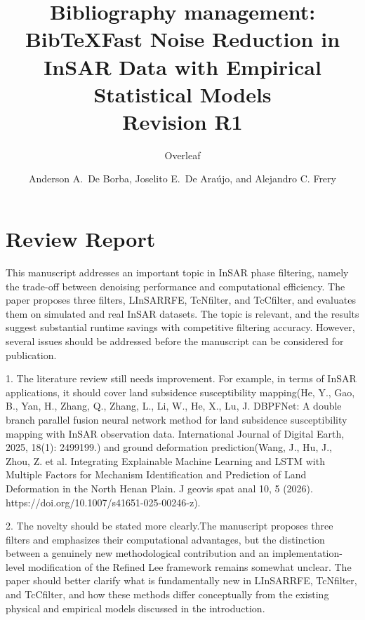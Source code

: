 \documentclass[a4paper,10pt]{article}
\title{Bibliography management: BibTeX}
\author{Overleaf}
\begin{document}
\title{Fast Noise Reduction in InSAR Data with Empirical Statistical Models\\
	Revision R1}


\author{Anderson A.\ De Borba,
	Joselito E.\ De Araújo, and
	Alejandro C. Frery}


\maketitle


\section{Review Report}
\begin{tcolorbox}[colback=red!5!white,colframe=red!75!black,title=Review Report]
This manuscript addresses an important topic in InSAR phase filtering, namely the trade-off between denoising performance and computational efficiency. The paper proposes three filters, LInSARRFE, TcNfilter, and TcCfilter, and evaluates them on
simulated and real InSAR datasets. The topic is relevant, and the results suggest
substantial runtime savings with competitive filtering accuracy. However, several
issues should be addressed before the manuscript can be considered for publication.

1. The literature review still needs improvement. For example, in terms of
InSAR applications, it should cover land subsidence susceptibility mapping(He, Y.,
Gao, B., Yan, H., Zhang, Q., Zhang, L., Li, W., He, X., Lu, J. DBPFNet: A double
branch parallel fusion neural network method for land subsidence susceptibility
mapping with InSAR observation data. International Journal of Digital Earth, 2025,
18(1): 2499199.) and ground deformation prediction(Wang, J., Hu, J., Zhou, Z. et al.
Integrating Explainable Machine Learning and LSTM with Multiple Factors for
Mechanism Identification and Prediction of Land Deformation in the North Henan
Plain. J geovis spat anal 10, 5 (2026). https://doi.org/10.1007/s41651-025-00246-z).

2. The novelty should be stated more clearly.The manuscript proposes three
filters and emphasizes their computational advantages, but the distinction between a
genuinely new methodological contribution and an implementation-level modification
of the Refined Lee framework remains somewhat unclear. The paper should better
clarify what is fundamentally new in LInSARRFE, TcNfilter, and TcCfilter, and how
these methods differ conceptually from the existing physical and empirical models
discussed in the introduction.


\end{tcolorbox}
\end{document}
